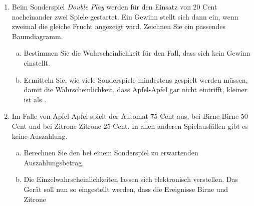 \begin{exercise}
\begin{minipage}[t]{0.40\textwidth}
{%
      }%
    \end{minipage}
    \begin{enumerate}[1)]
      \setlength   {\followlen}{\introlen}%
      \addtolength {\followlen}{-\leftskip}%
      \addtolength {\followlen}{-\leftmargini}%
      \item \begin{minipage}[t]{\followlen}
              Beim Sonderspiel \textit{Double Play} werden für den Einsatz
              von 20 Cent nacheinander zwei Spiele gestartet. Ein Gewinn
              stellt sich dann ein, wenn zweimal die gleiche Frucht
              angezeigt wird. Zeichnen Sie ein passendes Baumdiagramm.
            \end{minipage}
            \begin{enumerate}[a)]
              \item Bestimmen Sie die Wahrscheinlichkeit für den Fall,
                    dass sich kein Gewinn einstellt.
              \item Ermitteln Sie, wie viele Sonderspiele mindestens
                    gespielt werden müssen, damit die Wahrscheinlichkeit,
                    dass \glqq Apfel-Apfel\grqq{} gar nicht eintrifft,
                    kleiner ist als .
            \end{enumerate}
      \item Im Falle von \glqq Apfel-Apfel\grqq{} spielt der Automat
            75 Cent aus, bei \glqq Birne-Birne\grqq{} 50 Cent und
            bei \glqq Zitrone-Zitrone\grqq{} 25 Cent.
            In allen anderen Spielausfällen gibt es keine Auszahlung.
            \begin{enumerate}[a)]
              \item Berechnen Sie den bei einem Sonderspiel zu
                    erwartenden Auszahlungsbetrag.
              \item Die Einzelwahrscheinlichkeiten lassen sich
                    elektronisch verstellen. Das Gerät soll nun so
                    eingestellt werden, dass die Ereignisse
                    \glqq Birne\grqq{} und \glqq Zitrone\grqq{}

\end{enumerate}
\end{enumerate}
\end{exercise}
